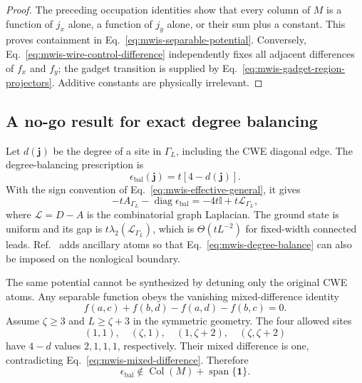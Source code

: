 \begin{proof}
The preceding occupation identities show that every column of $M$ is a
function of $j_x$ alone, a function of $j_y$ alone, or their sum plus a
constant.  This proves containment in Eq.~\eqref{eq:mwis-separable-potential}.
Conversely, Eq.~\eqref{eq:mwis-wire-control-difference} independently fixes
all adjacent differences of $f_x$ and $f_y$; the gadget transition is supplied
by Eq.~\eqref{eq:mwis-gadget-region-projectors}.  Additive constants are
physically irrelevant.
\end{proof}

\subsection{A no-go result for exact degree balancing}

Let $d(\mathbf j)$ be the degree of a site in $\Gamma_L$, including the CWE
diagonal edge.  The degree-balancing prescription is
\begin{equation}
 \epsilon_{\mathrm{bal}}(\mathbf j)=t[4-d(\mathbf j)].
 \label{eq:mwis-degree-balance}
\end{equation}
With the sign convention of Eq.~\eqref{eq:mwis-effective-general}, it gives
\begin{equation}
 -tA_{\Gamma_L}-\operatorname{diag}\epsilon_{\mathrm{bal}}
 =-4t\mathbb I+t\mathcal L_{\Gamma_L},
 \label{eq:mwis-laplacian-form}
\end{equation}
where $\mathcal L=D-A$ is the combinatorial graph Laplacian.  The ground state
is uniform and its gap is $t\lambda_2(\mathcal L_{\Gamma_L})$, which is
$\Theta(tL^{-2})$ for fixed-width connected leads.  Ref.~\cite{bombieri2025quantum}
adds ancillary atoms so that Eq.~\eqref{eq:mwis-degree-balance} can also be
imposed on the nonlogical boundary.

The same potential cannot be synthesized by detuning only the original CWE
atoms.  Any separable function obeys the vanishing mixed-difference identity
\begin{equation}
 f(a,c)+f(b,d)-f(a,d)-f(b,c)=0.
 \label{eq:mwis-mixed-difference}
\end{equation}
Assume $\zeta\geq3$ and $L\geq\zeta+3$ in the symmetric geometry.  The four
allowed sites
\begin{equation}
 (1,1),\quad(\zeta,1),\quad(1,\zeta+2),\quad
 (\zeta,\zeta+2)
\end{equation}
have $4-d$ values $2,1,1,1$, respectively.  Their mixed difference is one,
contradicting Eq.~\eqref{eq:mwis-mixed-difference}.  Therefore
\begin{equation}
 \epsilon_{\mathrm{bal}}\notin
 \operatorname{Col}(M)+\operatorname{span}\{\mathbf 1\}.
 \label{eq:mwis-rank-obstruction}
\end{equation}

